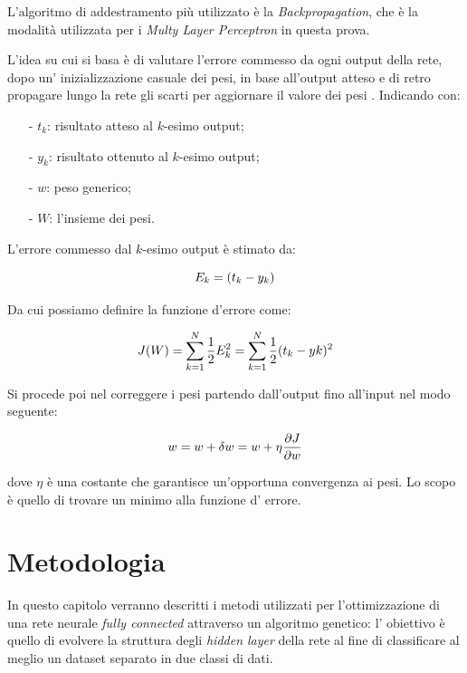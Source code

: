 \documentclass[12pt,a4paper]{report}
\begin{document}
L'algoritmo di addestramento più utilizzato è la \textit{Backpropagation}, che è la modalità utilizzata per i \textit{Multy Layer Perceptron} in questa prova.

L'idea su cui si basa è di valutare l'errore commesso da ogni output della rete, dopo un' inizializzazione casuale dei pesi, in base all'output atteso e di retro propagare lungo la rete gli scarti per aggiornare il valore dei pesi \cite{backprop}.
Indicando con:

\begin{enumerate}
 \item[-] $t_{k}$: risultato atteso al $k$-esimo output;
 \item[-] $y_{k}$: risultato ottenuto al $k$-esimo output;
 \item[-] $w$: peso generico;
 \item[-] $W$: l'insieme dei pesi.
\end{enumerate}

L'errore commesso dal $k$-esimo output è stimato da:

\begin{equation}
 \centering
 E_{k} = (t_{k}-y_{k})
\end{equation}

Da cui possiamo definire la funzione d'errore come:

\begin{equation}
 \centering
 J(W) = \sum_{k = 1}^{N}\frac{1}{2}E_{k}^2 = \sum_{k = 1}^{N}\frac{1}{2}(t_{k}-y{k})^2
\end{equation}

Si procede poi nel correggere i pesi partendo dall'output fino all'input nel modo seguente:

\begin{equation}
 \centering
 w = w + \delta w = w + \eta \frac{\partial J}{\partial w}
\end{equation}

dove $\eta$ è una costante che garantisce un'opportuna convergenza ai pesi. 
Lo scopo è quello di trovare un minimo alla funzione d' errore. \cite{backprop}

\chapter{Metodologia}

In questo capitolo verranno descritti i metodi utilizzati per l'ottimizzazione di una rete neurale \textit{fully connected} attraverso un algoritmo genetico: l' obiettivo è quello di evolvere la struttura degli \textit{hidden layer} della rete al fine di classificare al meglio un dataset separato in due classi di dati.
\end{document}
